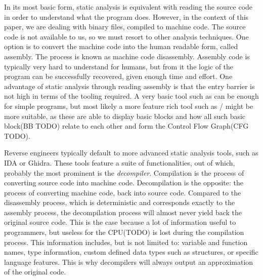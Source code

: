 In its most basic form, static analysis is equivalent with reading the source code in order to understand what the program does. However, in the context of this paper, we are dealing with binary files, compiled to machine code. The source code is not available to us, so we must resort to other analysis techniques. One option is to convert the machine code into the human readable form, called assembly. The process is known as machine code disassembly. Assembly code is typically very hard to understand for humans, but from it the logic of the program can be successfully recovered, given enough time and effort. One advantage of static analysis through reading assembly is that the entry barrier is not high in terms of the tooling required. A very basic tool such as  \cite{TODO} can be enough for simple programs, but most likely a more feature rich tool such as / \cite{TODO} might be more suitable, as these are able to display basic blocks and how all such basic block(BB TODO) relate to each other and form the Control Flow Graph(CFG TODO).

Reverse engineers typically default to more advanced static analysis tools, such as IDA or Ghidra. These tools feature a suite of functionalities, out of which, probably the most prominent is the \emph{decompiler}. Compilation is the process of converting source code into machine code. Decompilation is the opposite: the process of converting machine code, back into source code. Compared to the disassembly process, which is deterministic and corresponds exactly to the assembly process, the decompilation process will almost never yield back the original source code. This is the case because a lot of information useful to programmers, but useless for the CPU(TODO) is lost during the compilation process. This information includes, but is not limited to: variable and function names, type information, custom defined data types such as structures, or specific language features. This is why decompilers will always output an approximation of the original code. 

